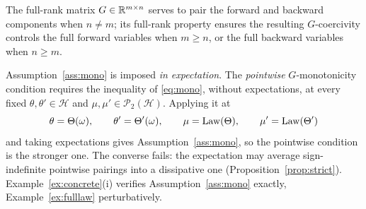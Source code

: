 \begin{remark}\label{rem:G-pairing}
The full-rank matrix $G\in\mathbb{R}^{m\times n}$ serves to pair the forward and backward
components when $n\neq m$; its full-rank property ensures the resulting $G$-coercivity
controls the full forward variables when $m\ge n$, or the full backward variables when
$n\ge m$.
\end{remark}
\begin{remark}\label{rem:diag-mono}
Assumption~\ref{ass:mono} is imposed \emph{in expectation}. The \emph{pointwise}
$G$-monotonicity condition requires the inequality of \eqref{eq:mono}, without expectations,
at every fixed $\theta,\theta'\in\mathcal H$ and $\mu,\mu'\in\mathcal P_2(\mathcal H)$.
Applying it at
\[
\theta=\Theta(\omega),\qquad \theta'=\Theta'(\omega),\qquad
\mu=\mathrm{Law}(\Theta),\qquad \mu'=\mathrm{Law}(\Theta')
\]
and taking expectations gives Assumption~\ref{ass:mono}, so the
pointwise condition is the stronger one. The converse
fails: the expectation may average sign-indefinite pointwise pairings into a dissipative one
(Proposition~\ref{prop:strict}). Example~\ref{ex:concrete}(i) verifies
Assumption~\ref{ass:mono} exactly, Example~\ref{ex:fulllaw} perturbatively.
\end{remark}

